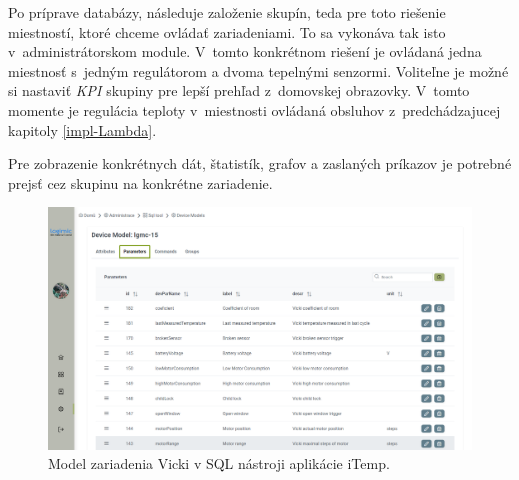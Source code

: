 Po príprave databázy, následuje založenie skupín, teda pre toto riešenie miestností, ktoré chceme ovládať zariadeniami. 
To sa vykonáva tak isto v~administrátorskom module. 
V~tomto konkrétnom riešení je ovládaná jedna miestnosť s~jedným regulátorom a dvoma tepelnými senzormi. 
Voliteľne je možné si nastaviť \emph{KPI} skupiny pre lepší prehľad z~domovskej obrazovky. V~tomto momente je regulácia teploty v~miestnosti ovládaná obsluhov z~predchádzajucej  kapitoly \ref{impl-Lambda}.

Pre zobrazenie konkrétnych dát, štatistík, grafov a zaslaných príkazov je potrebné prejsť cez skupinu na konkrétne zariadenie.

\begin{figure}[H]
    \centering
    \includegraphics[width=\columnwidth]{obrazky-figures/Screenshot_13.png}
    \caption{Model zariadenia Vicki v SQL nástroji aplikácie iTemp.}
    \label{fig:model}
\end{figure}